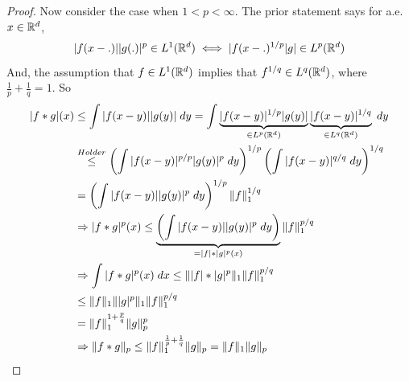 \begin{proof}
    \vspace{2cm}

    Now consider the case when $1 < p < \infty$.
    The prior statement says for a.e. $x \in \mathbb{R}^d$,
    \[
        |f(x - .)| |g(.)|^p \in L^1(\mathbb{R}^d) \iff |f(x - .)^{1/p} |g| \in L^p(\mathbb{R}^d)
    \]   
    And, the assumption that $f \in L^1(\mathbb{R}^d)$ implies that $f^{1/q} \in L^q(\mathbb{R}^d)$, where $\frac{1}{p} + \frac{1}{q} = 1$.
    So
    \begin{align*}
        |f*g|(x) &\leq \int |f(x- y)||g(y)| \; dy = \int \underbrace{|f(x-y)|^{1/p} |g(y)|}_{\in L^p(\mathbb{R}^d)} \underbrace{|f(x-y)|^{1/q}}_{\in L^q(\mathbb{R}^d)} \; dy \\
        &\stackrel{Holder}{\leq} \left(\int |f(x-y)|^{p/p} |g(y)|^p \; dy\right)^{1/p} \left(\int |f(x-y)|^{q/q} \; dy\right)^{1/q}\\
        &= \left(\int |f(x-y)| |g(y)|^p \; dy\right)^{1/p} \| f \|_1^{1/q} \\
        &\Rightarrow |f*g|^p(x) \leq \underbrace{\left(\int |f(x-y)| |g(y)|^p \; dy\right)}_{= |f| * |g|^p(x)} \| f \|_1^{p/q} \\
        &\Rightarrow \int |f*g|^p(x) \; dx \leq \| |f| * |g|^p \|_{1} \| f \|_1^{p/q} \\
        &\leq \| f \|_1 \| |g|^p \|_1 \| f \|_1 ^{p/q} \\
        &= \| f \|_1^{1 + \frac{p}{q}} \| g \|_p^p \\
        &\Rightarrow \| f * g \|_p \leq \| f \|_1 ^{\frac{1}{p} + \frac{1}{q}} \| g \|_p = \| f \|_1 \| g \|_p \qedhere    
    \end{align*}
\end{proof}

